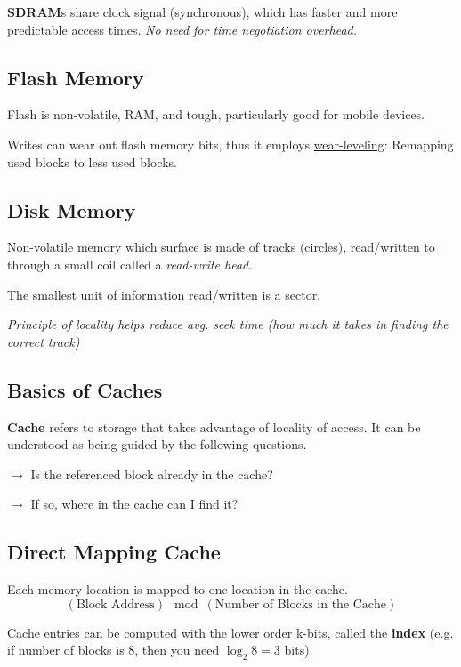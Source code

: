 \documentclass[11pt]{article}
\begin{document}
\textbf{SDRAM}s share clock signal (synchronous), which has faster and more predictable access times. \textit{No need for time negotiation overhead.}

\subsection*{Flash Memory}

Flash is non-volatile, RAM, and tough, particularly good for mobile devices.

Writes can wear out flash memory bits, thus it employs \underline{wear-leveling}: Remapping used blocks to less used blocks.

\subsection*{Disk Memory}

Non-volatile memory which surface is made of tracks (circles), read/written to through a small coil called a \textit{read-write head}.

The smallest unit of information read/written is a sector.

\textit{Principle of locality helps reduce avg. seek time (how much it takes in finding the correct track)}

\subsection*{Basics of Caches}

\textbf{Cache} refers to storage that takes advantage of locality of access. It can be understood as being guided by the following questions.

$\rightarrow$ Is the referenced block already in the cache?

$\rightarrow$ If so, where in the cache can I find it?

\subsection*{Direct Mapping Cache}

Each memory location is mapped to one location in the cache.
\vspace{-1em}
$$(\text{Block Address}) \mod (\text{Number of Blocks in the Cache})$$

Cache entries can be computed with the lower order k-bits, called the \textbf{index} (e.g. if number of blocks is 8, then you need $\log_{2}{8}=3$ bits).
\end{document}
